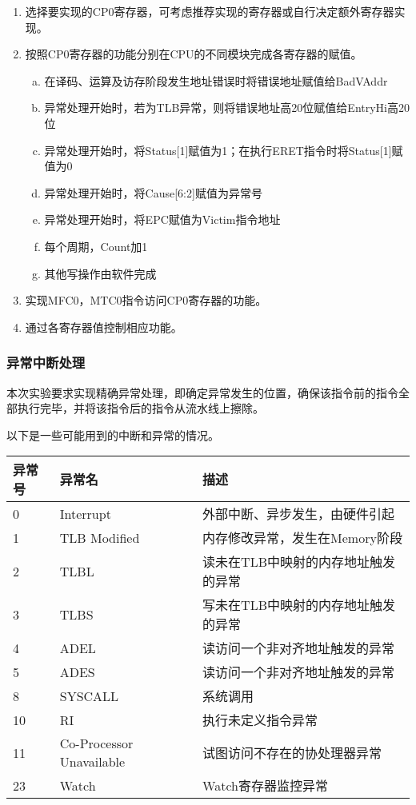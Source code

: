 \begin{enumerate}[(1)]
\item 选择要实现的CP0寄存器，可考虑推荐实现的寄存器或自行决定额外寄存器实现。

\item 按照CP0寄存器的功能分别在CPU的不同模块完成各寄存器的赋值。

\begin{enumerate}[(a)]
\item 在译码、运算及访存阶段发生地址错误时将错误地址赋值给BadVAddr

\item 异常处理开始时，若为TLB异常，则将错误地址高20位赋值给EntryHi高20位

\item 异常处理开始时，将Status[1]赋值为1；在执行ERET指令时将Status[1]赋值为0

\item 异常处理开始时，将Cause[6:2]赋值为异常号

\item 异常处理开始时，将EPC赋值为Victim指令地址

\item 每个周期，Count加1

\item 其他写操作由软件完成 
\end{enumerate}

\item 实现MFC0，MTC0指令访问CP0寄存器的功能。

\item 通过各寄存器值控制相应功能。

\end{enumerate}


\subsubsection{异常中断处理}
本次实验要求实现精确异常处理，即确定异常发生的位置，确保该指令前的指令全部执行完毕，并将该指令后的指令从流水线上擦除。

以下是一些可能用到的中断和异常的情况。

\begin{table}[H]
\centering
\begin{tabular}{lll}
\hline
异常号&异常名&描述\\
\hline
0&Interrupt&外部中断、异步发生，由硬件引起\\
1&TLB Modified&内存修改异常，发生在Memory阶段\\
2&TLBL&读未在TLB中映射的内存地址触发的异常\\
3&TLBS&写未在TLB中映射的内存地址触发的异常\\
4&ADEL&读访问一个非对齐地址触发的异常\\
5&ADES&读访问一个非对齐地址触发的异常\\
8&SYSCALL&系统调用\\
10&RI&执行未定义指令异常\\
11&Co-Processor Unavailable&试图访问不存在的协处理器异常\\
23&Watch&Watch寄存器监控异常\\
\hline
\end{tabular}
\end{table}

